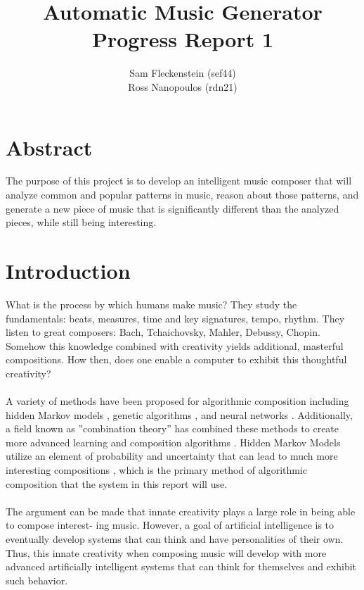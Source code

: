\documentclass{article}
\begin{document}
\clearpage
{}
\begin{center}
\begin{minipage}{.6\textwidth}

\title{Automatic Music Generator \\ \vspace{2 pt} \Large{Progress Report 1}}
\author{Sam Fleckenstein (sef44) \\ Ross Nanopoulos (rdn21)}
\maketitle

\end{minipage}
\end{center}
\clearpage

\tableofcontents
\newpage

\section{Abstract}
The purpose of this project is to develop an intelligent music composer that will analyze common and popular patterns in music, reason about those patterns, and generate a new piece of music that is significantly different than the analyzed pieces, while still being interesting.

\newpage

\section{Introduction}
What is the process by which humans make music? They study the fundamentals: beats, measures, time
and key signatures, tempo, rhythm. They listen to great composers: Bach, Tchaichovsky, Mahler, Debussy,
Chopin. Somehow this knowledge combined with creativity yields additional, masterful compositions. How
then, does one enable a computer to exhibit this thoughtful creativity?\\
\\
A variety of methods have been proposed for algorithmic composition including hidden Markov models
\cite{SOMETHING GOES HERE}, genetic algorithms \cite{SOMETHING GOES HERE}, and neural networks \cite{SOMETHING GOES HERE}. 
Additionally, a field known as ”combination theory” has combined these methods to create more advanced learning 
and composition algorithms \cite{SOMETHING GOES HERE}. Hidden Markov Models utilize an element of probability 
and uncertainty that can lead to much more interesting compositions \cite{SOMETHING GOES HERE}, which is the 
primary method of algorithmic composition that the system in this report will use.\\
\\
The argument can be made that innate creativity plays a large role in being able to compose interest-
ing music. However, a goal of artificial intelligence is to eventually develop systems that can think and
have personalities of their own. Thus, this innate creativity when composing music will develop with more
advanced artificially intelligent systems that can think for themselves and exhibit such behavior.
\end{document}
